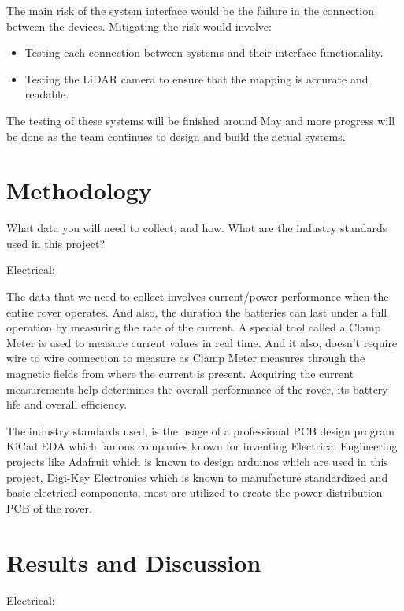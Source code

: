 \documentclass[a4paper, 10pt]{article}
\begin{document}
The main risk of the system interface would be the failure in the connection between the devices. Mitigating the risk would involve:

\begin{itemize}
\item
Testing each connection between systems and their interface functionality.

\item
Testing the LiDAR camera to ensure that the mapping is accurate and readable. 
\end{itemize}

The testing of these systems will be finished around May and more progress will be done as the team continues to design and build the actual systems.

\section{Methodology}

What data you will need to collect, and how. 
What are the industry standards used in this project? 

Electrical:

The data that we need to collect involves current/power performance when the entire rover operates. And also, the duration the batteries can last under a full operation by measuring the rate of the current. A special tool called a Clamp Meter is used to measure current values in real time. And it also, doesn't require wire to wire connection to measure as Clamp Meter measures through the magnetic fields from where the current is present. Acquiring the current measurements help determines the overall performance of the rover, its battery life and overall efficiency.

The industry standards used, is the usage of a professional PCB design program KiCad EDA which famous companies known for inventing Electrical Engineering projects like Adafruit which is known to design arduinos which are used in this project, Digi-Key Electronics which is known to manufacture standardized and basic electrical components, most are utilized to create the power distribution PCB of the rover.

\section{Results and Discussion}

Electrical:
\end{document}
